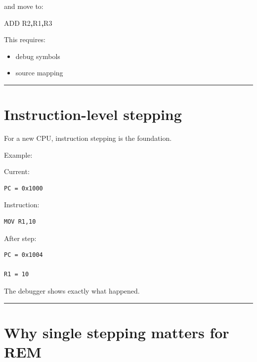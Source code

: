 \documentclass[
  oneside,
  openany]{book}
\newenvironment{Shaded}{\begin{snugshade}}{\end{snugshade}}
\newcommand{\BuiltInTok}[1]{#1}
\newcommand{\NormalTok}[1]{#1}
\newcommand{\OperatorTok}[1]{\textcolor[rgb]{0.81,0.36,0.00}{\textbf{#1}}}
\providecommand{\tightlist}{%
  \setlength{\itemsep}{0pt}\setlength{\parskip}{0pt}}
\begin{document}
and move to:

\begin{Shaded}
\begin{Highlighting}[]
\BuiltInTok{ADD}\NormalTok{ R2}\OperatorTok{,}\NormalTok{R1}\OperatorTok{,}\NormalTok{R3}
\end{Highlighting}
\end{Shaded}

This requires:

\begin{itemize}
\tightlist
\item
  debug symbols
\item
  source mapping
\end{itemize}

\begin{center}\rule{0.5\linewidth}{0.5pt}\end{center}

\hypertarget{instruction-level-stepping}{%
\section{Instruction-level stepping}\label{instruction-level-stepping}}

For a new CPU, instruction stepping is the foundation.

Example:

Current:

\begin{verbatim}
PC = 0x1000
\end{verbatim}

Instruction:

\begin{verbatim}
MOV R1,10
\end{verbatim}

After step:

\begin{verbatim}
PC = 0x1004

R1 = 10
\end{verbatim}

The debugger shows exactly what happened.

\begin{center}\rule{0.5\linewidth}{0.5pt}\end{center}

\hypertarget{why-single-stepping-matters-for-rem}{%
\section{Why single stepping matters for
REM}\label{why-single-stepping-matters-for-rem}}
\end{document}
